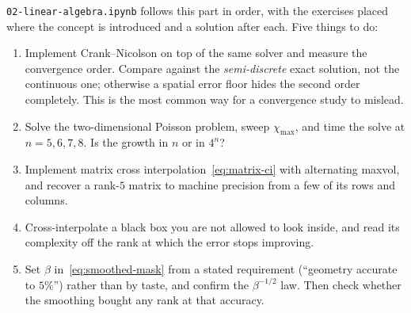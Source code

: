 \begin{exercise}
  \texttt{02-linear-algebra.ipynb} follows this part in order, with the
  exercises placed where the concept is introduced and a solution after each.
  Five things to do:

  \begin{enumerate}
    \item Implement Crank--Nicolson on top of the same solver and measure the
      convergence order. Compare against the \emph{semi-discrete} exact solution,
      not the continuous one; otherwise a spatial error floor hides the second
      order completely. This is the most common way for a convergence study to
      mislead.
    \item Solve the two-dimensional Poisson problem, sweep $\chi_{\max}$, and
      time the solve at $n = 5,6,7,8$. Is the growth in $n$ or in $4^n$?
    \item Implement matrix cross interpolation~\eqref{eq:matrix-ci} with
      alternating maxvol, and recover a rank-$5$ matrix to machine precision
      from a few of its rows and columns.
    \item Cross-interpolate a black box you are not allowed to look inside, and
      read its complexity off the rank at which the error stops improving.
    \item Set $\beta$ in~\eqref{eq:smoothed-mask} from a stated requirement
      (\enquote{geometry accurate to $5\%$}) rather than by taste, and confirm
      the $\beta^{-1/2}$ law. Then check whether the smoothing bought any rank
      at that accuracy.
  \end{enumerate}
\end{exercise}
